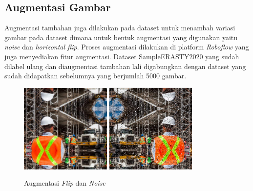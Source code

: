 \subsection{Augmentasi Gambar}
\par Augmentasi tambahan juga dilakukan pada dataset untuk menambah variasi gambar pada dataset dimana untuk bentuk augmentasi yang digunakan yaitu \emph{noise} dan \emph{horizontal flip}. Proses augmentasi dilakukan di platform \emph{Roboflow} yang juga menyediakan fitur augmentasi. Dataset SampleERASTY2020 yang sudah dilabel ulang dan diaugmentasi tambahan lali digabungkan dengan dataset yang sudah didapatkan sebelumnya yang berjumlah 5000 gambar. 

\begin{figure}[ht]
  \centering
  \includegraphics[width=0.4\textwidth]{gambar/aug_flip.png}
  \includegraphics[width=0.4\textwidth]{gambar/aug_noise.png}
  \caption{Augmentasi \emph{Flip} dan \emph{Noise}}
  \label{fig:prepro_augmentasi}  
\end{figure}


